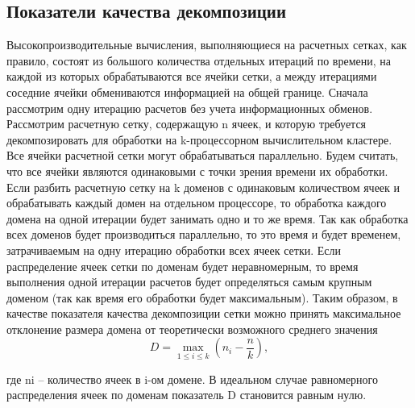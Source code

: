 \subsection{Показатели качества декомпозиции}

Высокопроизводительные вычисления, выполняющиеся на расчетных сетках, как правило, состоят из большого количества отдельных итераций по времени, на каждой из которых обрабатываются все ячейки сетки, а между итерациями соседние ячейки обмениваются информацией на общей границе.
Сначала рассмотрим одну итерацию расчетов без учета информационных обменов.
Рассмотрим расчетную сетку, содержащую n ячеек, и которую требуется декомпозировать для обработки на k-процессорном вычислительном кластере.
Все ячейки расчетной сетки могут обрабатываться параллельно.
Будем считать, что все ячейки являются одинаковыми с точки зрения времени их обработки.
Если разбить расчетную сетку на k доменов с одинаковым количеством ячеек и обрабатывать каждый домен на отдельном процессоре, то обработка каждого домена на одной итерации будет занимать одно и то же время.
Так как обработка всех доменов будет производиться параллельно, то это время и будет временем, затрачиваемым на одну итерацию обработки всех ячеек сетки.
Если распределение ячеек сетки по доменам будет неравномерным, то время выполнения одной итерации расчетов будет определяться самым крупным доменом (так как время его обработки будет максимальным).
Таким образом, в качестве показателя качества декомпозиции сетки можно принять максимальное отклонение размера домена от теоретически возможного среднего значения
\begin{equation}
	D = \max_{1 \le i \le k}{ \left( n_i - \frac{n}{k} \right) },
\end{equation}
 
где ni – количество ячеек в i-ом домене.
В идеальном случае равномерного распределения ячеек по доменам показатель D становится равным нулю.

